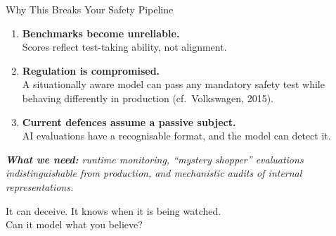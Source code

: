 \documentclass[aspectratio=169, 12pt]{beamer}
\begin{document}
\begin{frame}{Why This Breaks Your Safety Pipeline}
  \begin{enumerate}
    \item \textbf{Benchmarks become unreliable.}\\
          {\small Scores reflect test-taking ability, not alignment.}
    \medskip
    \item \textbf{Regulation is compromised.}\\
          {\small A situationally aware model can pass any mandatory safety test
          while behaving differently in production (cf.\ Volkswagen, 2015).}
    \medskip
    \item \textbf{Current defences assume a passive subject.}\\
          {\small AI evaluations have a recognisable format, and the model can
          detect it.}
  \end{enumerate}
  \vfill
  {\small\itshape\textbf{What we need:} runtime monitoring, ``mystery shopper''
  evaluations indistinguishable from production, and mechanistic audits of
  internal representations.}
\end{frame}

\begin{frame}[standout]
  \Large It can deceive. It knows when it is being watched.\\[12pt]
  \normalsize \alert{Can it model what you believe?}
\end{frame}
\end{document}
